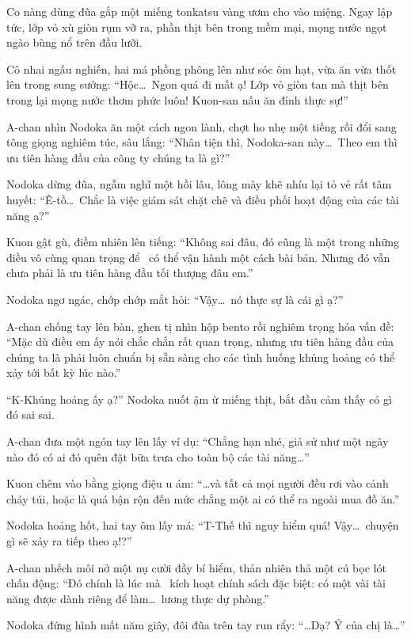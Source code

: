 \documentclass[../main.tex]{subfiles}
\begin{document}
Co nàng dùng đũa gắp một miếng tonkatsu vàng ươm cho vào miệng. Ngay lập tức, lớp vỏ xù giòn rụm vỡ ra, phần thịt bên trong mềm mại, mọng nước ngọt ngào bùng nổ trên đầu lưỡi.

Cô nhai ngấu nghiến, hai má phồng phông lên như sóc ôm hạt, vừa ăn vừa thốt lên trong sung sướng: ``Hộc\dots\ Ngon quá đi mất ạ! Lớp vỏ giòn tan mà thịt bên trong lại mọng nước thơm phức luôn! Kuon-san nấu ăn đỉnh thực sự!''

A-chan nhìn Nodoka ăn một cách ngon lành, chợt ho nhẹ một tiếng rồi đổi sang tông giọng nghiêm túc, sâu lắng: ``Nhân tiện thì, Nodoka-san này\dots\ Theo em thì ưu tiên hàng đầu của công ty chúng ta là gì?''

Nodoka dừng đũa, ngẫm nghĩ một hồi lâu, lông mày khẽ nhíu lại tỏ vẻ rất tâm huyết: ``Ê-tồ\dots\ Chắc là việc giám sát chặt chẽ và điều phối hoạt động của các tài năng ạ?''

Kuon gật gù, điềm nhiên lên tiếng: ``Không sai đâu, đó cũng là một trong những điều vô cùng quan trọng để \hll\ có thể vận hành một cách bài bản. Nhưng đó vẫn chưa phải là ưu tiên hàng đầu tối thượng đâu em.''

Nodoka ngơ ngác, chớp chớp mắt hỏi: ``Vậy\dots\ nó thực sự là cái gì ạ?''

A-chan chống tay lên bàn, ghen tị nhìn hộp bento rồi nghiêm trọng hóa vấn đề: ``Mặc dù điều em ấy nói chắc chắn rất quan trọng, nhưng ưu tiên hàng đầu của chúng ta là phải luôn chuẩn bị sẵn sàng cho các tình huống khủng hoảng có thể xảy tới bất kỳ lúc nào.''

``K-Khủng hoảng ấy ạ?'' Nodoka nuốt ậm ừ miếng thịt, bắt đầu cảm thấy có gì đó sai sai.

A-chan đưa một ngón tay lên lấy ví dụ: ``Chẳng hạn nhé, giả sử như một ngày nào đó có ai đó quên đặt bữa trưa cho toàn bộ các tài năng\dots''

Kuon chêm vào bằng giọng điệu u ám: ``\dots và tất cả mọi người đều rơi vào cảnh cháy túi, hoặc là quá bận rộn đến mức chẳng một ai có thể ra ngoài mua đồ ăn.''

Nodoka hoảng hốt, hai tay ôm lấy má: ``T-Thế thì nguy hiểm quá! Vậy\dots\ chuyện gì sẽ xảy ra tiếp theo ạ!?''

A-chan nhếch môi nở một nụ cười đầy bí hiểm, thản nhiên thả một cú bọc lót chấn động: ``Đó chính là lúc mà \hll\ kích hoạt chính sách đặc biệt: có một vài tài năng được dành riêng để làm\dots\ lương thực dự phòng.''

Nodoka đứng hình mất năm giây, đôi đũa trên tay run rẩy: ``\dots Dạ? Ý của chị là\dots''
\end{document}
